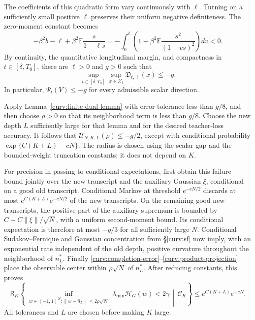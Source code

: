 \documentclass[11pt,reqno]{amsart}
\begin{document}
The coefficients of this quadratic form vary continuously with $\ell$.
Turning on a sufficiently small positive $\ell$ preserves their uniform
negative definiteness. The zero-moment constant becomes
\[
 -\beta^2b-\ell+\beta^2\mathbb E\frac{s}{1-\ell s}
 =-\int_0^\ell
       \left(1-\beta^2\mathbb E\frac{s^2}{(1-vs)^2}\right)dv<0.
\]
By continuity, the quantitative longitudinal margin, and compactness in
$t\in[\delta,T_0]$, there are $\ell>0$ and $g>0$ such that
\begin{equation*}
 \sup_{t\in[\delta,T_0]}\sup_{x\in\mathcal X_t}
                          \mathfrak D_{t,\ell}(x)\le-g.
\end{equation*}
In particular, $\Psi_t(V)\le-g$ for every admissible scalar direction.

Apply Lemma~\ref{curv:finite-dual-lemma} with error tolerance less than
$g/8$, and then choose $\rho>0$ so that its neighborhood term is less
than $g/8$. Choose the new depth $L$ sufficiently large for that lemma
and for the desired teacher-loss accuracy. It follows that
$\mathscr U_{N,K,L}(\rho)\le-g/2$, except with conditional probability
$\exp\{C(K+L)-cN\}$. The radius is chosen using the scalar gap and the
bounded-weight truncation constants; it does not depend on $K$.

For precision in passing to conditional expectations, first obtain this
failure bound jointly over the new transcript and the auxiliary Gaussian
$\xi$, conditional on a good old transcript. Conditional Markov at
threshold $e^{-cN/2}$ discards at most
$e^{C(K+L)}e^{-cN/2}$ of the new transcripts. On the remaining good new
transcripts, the positive part of the auxiliary supremum is bounded by
$C+C\|\xi\|/\sqrt N$, with a uniform second-moment bound. Its conditional
expectation is therefore at most $-g/3$ for all sufficiently large $N$.
Conditional Sudakov--Fernique and Gaussian concentration from
\S\ref{curv:sf} now imply, with an exponential rate independent of
the old depth, positive curvature throughout the neighborhood of
$n_L^*$. Finally \eqref{curv:completion-error}--\eqref{curv:product-projection}
place the observable center within $\rho\sqrt N$ of $n_L^*$. After
reducing constants, this proves
\begin{equation}\label{curv:reference-neighborhood}
 \mathsf R_K\left\{
  \inf_{\substack{w\in(-1,1)^N:\|w-\widehat n_L\|\le2\rho\sqrt N}}
       \lambda_{\min}\mathcal H_G(w)<2\gamma
                    \,\middle|\,\mathcal C_K\right\}
          \le e^{C(K+L)}e^{-cN}.
\end{equation}
All tolerances and $L$ are chosen before making $K$ large.
\end{document}
